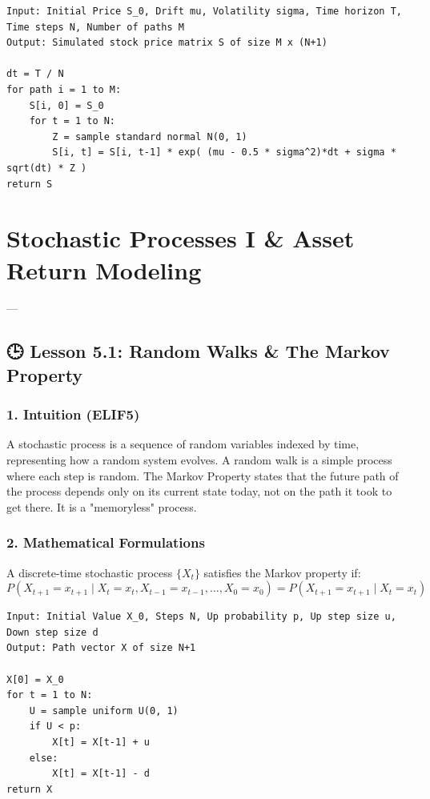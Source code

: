 \documentclass[11pt,oneside]{book}
\begin{document}
\begin{tcolorbox}[colback=white,colframe=black,boxrule=0.6pt,arc=0mm,title=Log-Normal Price Paths]
\begin{verbatim}
Input: Initial Price S_0, Drift mu, Volatility sigma, Time horizon T, Time steps N, Number of paths M
Output: Simulated stock price matrix S of size M x (N+1)

dt = T / N
for path i = 1 to M:
    S[i, 0] = S_0
    for t = 1 to N:
        Z = sample standard normal N(0, 1)
        S[i, t] = S[i, t-1] * exp( (mu - 0.5 * sigma^2)*dt + sigma * sqrt(dt) * Z )
return S
\end{verbatim}
\end{tcolorbox}


\newpage

\chapter{Stochastic Processes I & Asset Return Modeling}

---

\section{🕒 Lesson 5.1: Random Walks \& The Markov Property}

\subsection{1. Intuition (ELIF5)}
A stochastic process is a sequence of random variables indexed by time, representing how a random system evolves. A random walk is a simple process where each step is random. The Markov Property states that the future path of the process depends only on its current state today, not on the path it took to get there. It is a "memoryless" process.

\subsection{2. Mathematical Formulations}
A discrete-time stochastic process $\{X_t\}$ satisfies the Markov property if:
$$P(X_{t+1} = x_{t+1} \mid X_t = x_t, X_{t-1} = x_{t-1}, \dots, X_0 = x_0) = P(X_{t+1} = x_{t+1} \mid X_t = x_t)$$

\begin{tcolorbox}[colback=white,colframe=black,boxrule=0.6pt,arc=0mm,title=Simulating a Random Walk]
\begin{verbatim}
Input: Initial Value X_0, Steps N, Up probability p, Up step size u, Down step size d
Output: Path vector X of size N+1

X[0] = X_0
for t = 1 to N:
    U = sample uniform U(0, 1)
    if U < p:
        X[t] = X[t-1] + u
    else:
        X[t] = X[t-1] - d
return X
\end{verbatim}
\end{tcolorbox}
\end{document}
